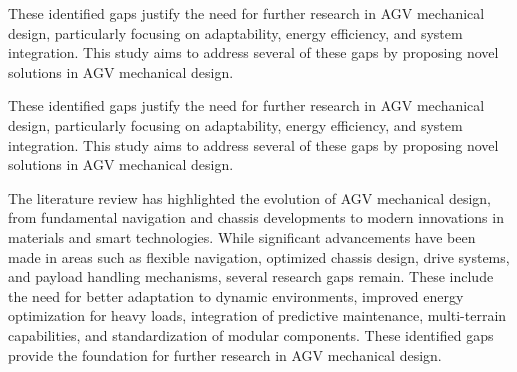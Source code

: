 \documentclass[../../main]{subfiles}
\begin{document}
These identified gaps justify the need for further research in AGV
mechanical design, particularly focusing on adaptability, energy
efficiency, and system integration. This study aims to address several
of these gaps by proposing novel solutions in AGV mechanical design.

These identified gaps justify the need for further research in AGV mechanical design, particularly focusing on adaptability, energy efficiency, and system integration. This study aims to address several of these gaps by proposing novel solutions in AGV mechanical design.

The literature review has highlighted the evolution of AGV mechanical
design, from fundamental navigation and chassis developments to modern
innovations in materials and smart technologies. While significant
advancements have been made in areas such as flexible navigation,
optimized chassis design, drive systems, and payload handling
mechanisms, several research gaps remain. These include the need for
better adaptation to dynamic environments, improved energy optimization
for heavy loads, integration of predictive maintenance, multi-terrain
capabilities, and standardization of modular components. These
identified gaps provide the foundation for further research in AGV
mechanical design.






\end{document}
